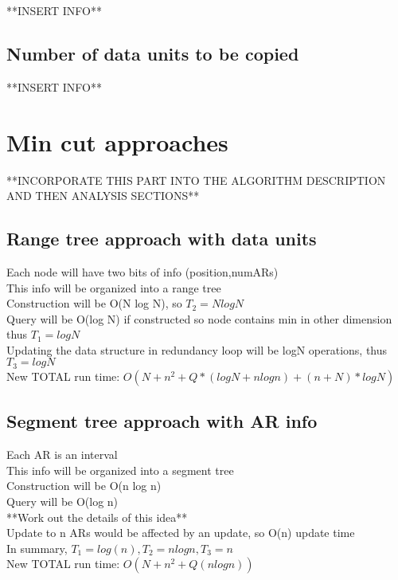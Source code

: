 \documentclass[11pt,psfig]{article}
\begin{document}
**INSERT INFO**

\subsection*{Number of data units to be copied} 

**INSERT INFO**

\section*{Min cut approaches}

**INCORPORATE THIS PART INTO THE ALGORITHM DESCRIPTION AND THEN ANALYSIS SECTIONS**

\subsection*{Range tree approach with data units}
Each node will have two bits of info (position,numARs)\\
This info will be organized into a range tree\\
Construction will be O(N log N), so $T_2=N logN$\\
Query will be O(log N) if constructed so node contains min in other dimension\\
 thus $T_1=logN$\\
Updating the data structure in redundancy loop will be logN operations, thus\\
 $T_3 = logN$\\
New TOTAL run time: $O(N + n^2 + Q*(logN + n log n) + (n+N)*logN)$

\subsection*{Segment tree approach with AR info}
		Each AR is an interval\\
		This info will be organized into a segment tree\\
		Construction will be O(n log n)\\
		Query will be O(log n)\\
			**Work out the details of this idea**\\
		Update to n ARs would be affected by an update, so O(n) update time\\
		In summary, $T_1=log(n), T_2=n logn, T_3 = n$\\
		New TOTAL run time: $O(N + n^2 + Q(n log n))$\\
\end{document}

